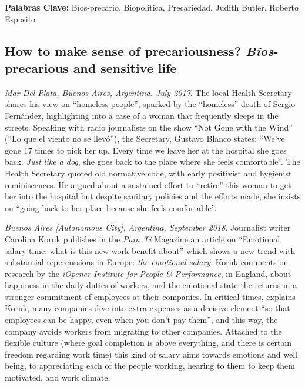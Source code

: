 \documentclass[a4paper,]{scrartcl}
\begin{document}
\textbf{Palabras Clave:} Bíos-precario, Biopolítica, Precariedad, Judith
Butler, Roberto Esposito


\subsection{\texorpdfstring{\textbf{How to make sense of precariousness?
\emph{Bíos}-precarious and sensitive
life}}{How to make sense of precariousness? Bíos-precarious and sensitive life}}\label{how-to-make-sense-of-precariousness-buxedos-precarious-and-sensitive-life}

\emph{Mar Del Plata, Buenos Aires, Argentina. July 2017}. The local
Health Secretary shares his view on ``homeless people'', sparked by the
``homeless'' death of Sergio Fernández, highlighting into a case of a
woman that frequently sleeps in the streets. Speaking with radio
journalists on the show ``Not Gone with the Wind'' (``Lo que el viento
no se llevó''), the Secretary, Gustavo Blanco states: ``We've gone 17
times to pick her up. Every time we leave her at the hospital she goes
back. \emph{Just like a dog}, she goes back to the place where she feels
comfortable''. The Health Secretary quoted old normative code, with
early positivist and hygienist reminiscences. He argued about a
sustained effort to ``retire'' this woman to get her into the hospital
but despite sanitary policies and the efforts made, she insists on
``going back to her place because she feels comfortable''.

\emph{Buenos Aires {[}Autonomous City{]}, Argentina, September 2018}.
Journalist writer Carolina Koruk publishes in the \emph{Para Tí}
Magazine an article on ``Emotional salary time: what is this new work
benefit about'' which shows a new trend with substantial repercussions
in Europe: \emph{the emotional salary}. Koruk comments on research by
the \emph{iOpener Institute for People \& Performance}, in England,
about happiness in the daily duties of workers, and the emotional state
the returns in a stronger commitment of employees at their companies. In
critical times, explains Koruk, many companies dive into extra expenses
as a decisive element ``so that employees can be happy, even when you
don't pay them'', and this way, the company avoids workers from
migrating to other companies. Attached to the flexible culture (where
goal completion is above everything, and there is certain freedom
regarding work time) this kind of salary aims towards emotions and well
being, to appreciating each of the people working, hearing to them to
keep them motivated, and work climate.
\end{document}
